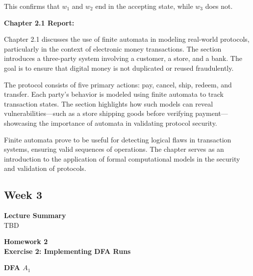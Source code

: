\documentclass{article}
\theoremstyle{theorem}
\theoremstyle{definition}
\theoremstyle{remark}
\begin{document}
This confirms that $w_1$ and $w_2$ end in the accepting state, while $w_3$ does not.


\textbf{Chapter 2.1 Report:}

Chapter 2.1 discusses the use of finite automata in modeling real-world protocols, particularly in the context of electronic money transactions. The section introduces a three-party system involving a customer, a store, and a bank. The goal is to ensure that digital money is not duplicated or reused fraudulently.

The protocol consists of five primary actions: pay, cancel, ship, redeem, and transfer. Each party's behavior is modeled using finite automata to track transaction states. The section highlights how such models can reveal vulnerabilities—such as a store shipping goods before verifying payment—showcasing the importance of automata in validating protocol security.

Finite automata prove to be useful for detecting logical flaws in transaction systems, ensuring valid sequences of operations. The chapter serves as an introduction to the application of formal computational models in the security and validation of protocols.

\subsection{Week 3}
\textbf{Lecture Summary}\\
TBD\bigskip\bigskip\bigskip\bigskip\bigskip\bigskip\bigskip\bigskip\bigskip\bigskip\bigskip\bigskip\bigskip\bigskip\bigskip\bigskip\bigskip\bigskip\bigskip\bigskip



{\textbf{{Homework 2}}}\\
\textbf{Exercise 2: Implementing DFA Runs}\\
\begin{center}
\textbf{DFA $A_1$}
\end{center}
\end{document}
